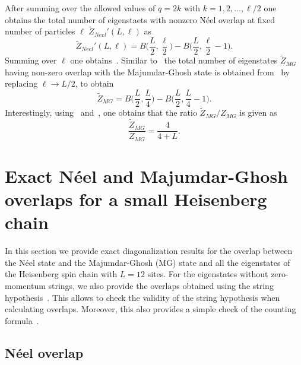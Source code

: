 \documentclass[11pt]{iopart}
\begin{document}
%
After summing over the allowed values of $q=2k$ with $k=1,2,\dots,\ell/2$ one obtains 
the total number of eigenstaets with nonzero N\'eel overlap at fixed number of 
particles $\ell$ $\widetilde Z_{Neel}'(L,\ell)$ as 
%
\begin{equation}
\label{neel-fi}
\widetilde Z_{Neel}'(L,\ell)=B\Big(\frac{L}{2},\frac{\ell}{2}\Big)-
B\Big(\frac{L}{2},\frac{\ell}{2}-1\Big).
\end{equation}
%
Summing over $\ell$ one obtains~. Similar to~ the total number 
of eigenstates $\widetilde Z_{MG}$ having non-zero overlap with the Majumdar-Ghosh state 
is obtained from~ by replacing $\ell\to L/2$, to obtain 
%
\begin{equation}
\label{mg-fi}
\widetilde Z_{MG}=B\Big(\frac{L}{2},\frac{L}{4}\Big)-B\Big(\frac{L}{2},\frac{L}{4}-1
\Big). 
\end{equation}
%
Interestingly, using~ and~, one obtains that the ratio 
$\widetilde Z_{MG}/Z_{MG}$ is given as 
%
\begin{equation}
\frac{\widetilde Z_{MG}}{Z_{MG}}=\frac{4}{4+L}. 
\end{equation}
%


\section{Exact N\'eel and Majumdar-Ghosh overlaps for a small Heisenberg chain} 
\label{app-L12}

In this section we provide exact diagonalization results for the overlap between the 
N\'eel state and the Majumdar-Ghosh (MG) state and all the eigenstates of the Heisenberg 
spin chain with $L=12$ sites. For the eigenstates without zero-momentum strings, we 
also provide the overlaps obtained using the string hypothesis~. 
This allows to check the validity of the string hypothesis when calculating overlaps. 
Moreover, this also provides a simple check of the counting formula~. 

\subsection{N\'eel overlap}
\label{app-neel}
\end{document}
